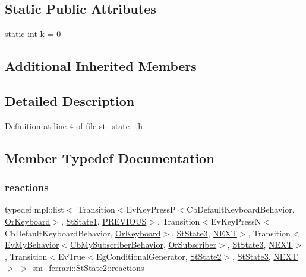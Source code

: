 \subsection*{Static Public Attributes}
\begin{DoxyCompactItemize}
\item 
static int \hyperlink{structsm__ferrari_1_1StState2_af43721743ea34cc998b16bc2857f85c3}{k} = 0
\end{DoxyCompactItemize}
\subsection*{Additional Inherited Members}


\subsection{Detailed Description}


Definition at line 4 of file st\+\_\+state\+\_.\+h.



\subsection{Member Typedef Documentation}
\mbox{\label{structsm__ferrari_1_1StState2_afc456f98dac68c03b15e69f5dff9e682}} 
\subsubsection{\texorpdfstring{reactions}{reactions}}
{\footnotesize\ttfamily typedef mpl\+::list$<$ Transition$<$Ev\+Key\+PressP$<$Cb\+Default\+Keyboard\+Behavior, \hyperlink{classsm__ferrari_1_1OrKeyboard}{Or\+Keyboard}$>$, \hyperlink{structsm__ferrari_1_1StState1}{St\+State1}, \hyperlink{structsm__ferrari_1_1StState2_1_1PREVIOUS}{P\+R\+E\+V\+I\+O\+US}$>$, Transition$<$Ev\+Key\+PressN$<$Cb\+Default\+Keyboard\+Behavior, \hyperlink{classsm__ferrari_1_1OrKeyboard}{Or\+Keyboard}$>$, \hyperlink{structsm__ferrari_1_1StState3}{St\+State3}, \hyperlink{structsm__ferrari_1_1StState2_1_1NEXT}{N\+E\+XT}$>$, Transition$<$\hyperlink{structsm__ferrari_1_1cl__subscriber_1_1EvMyBehavior}{Ev\+My\+Behavior}$<$\hyperlink{classsm__ferrari_1_1cl__subscriber_1_1CbMySubscriberBehavior}{Cb\+My\+Subscriber\+Behavior}, \hyperlink{classsm__ferrari_1_1OrSubscriber}{Or\+Subscriber}$>$, \hyperlink{structsm__ferrari_1_1StState3}{St\+State3}, \hyperlink{structsm__ferrari_1_1StState2_1_1NEXT}{N\+E\+XT}$>$, Transition$<$Ev\+True$<$Eg\+Conditional\+Generator, \hyperlink{structsm__ferrari_1_1StState2}{St\+State2}$>$, \hyperlink{structsm__ferrari_1_1StState3}{St\+State3}, \hyperlink{structsm__ferrari_1_1StState2_1_1NEXT}{N\+E\+XT}$>$ $>$ \hyperlink{structsm__ferrari_1_1StState2_afc456f98dac68c03b15e69f5dff9e682}{sm\+\_\+ferrari\+::\+St\+State2\+::reactions}}



